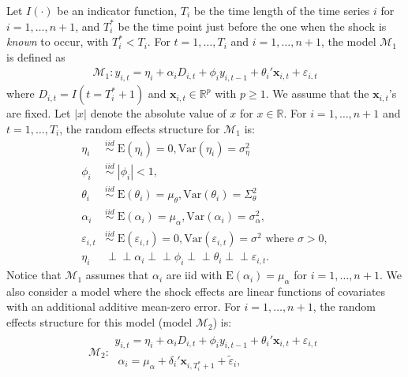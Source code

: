 \documentclass[11pt]{article}
\newcommand{\R}{\mathbb{R}}
\newcommand{\x}{\textbf{x}}
\def\mbf#1{\mathbf{#1}} %
\newcommand{\simiid}{\stackrel{iid}{\sim}} %
\def\where{\text{ where }} %
\newcommand{\indep}{\perp \!\!\! \perp } %
\newcommand{\reals}{\mathbb{R}} %
\def\t#1{\tilde{#1}} %
\def\mc#1{\mathcal{#1}} %
\def\E#1{\mathrm{E}(#1)} %
\def\var#1{\mathrm{Var}(#1)} %
\theoremstyle{definition}
\begin{document}
Let $I(\cdot)$ be an indicator function, $T_i$ be the time length of the time series $i$ for $i = 1, \ldots, n+1$, and $T_i^*$ be the time point just before the one when the shock is \emph{known} to occur, with $T_i^* < T_i$.  For $t= 1, \ldots, T_i$ and $i = 1, \ldots, n+1$, the model $\mc{M}_1$ is defined as
\begin{align}
\mc{M}_1 \colon y_{i,t} =\eta_i +\alpha_i D_{i,t} + \phi_i y_{i, t-1} + \theta_i'\mbf{x}_{i,t} + \varepsilon_{i,t}\label{equation1}
\end{align}
 where $D_{i,t} = I(t = T_i^* + 1)$ 
and $\x_{i,t} \in \R^{p}$ with $p \geq 1$.  We assume that the 
$\mbf{x}_{i,t}$'s are fixed. Let $|x|$ denote the absolute value of $x$ for $x\in \reals$. For $i = 1, \ldots, n+1$ and $t=1, \ldots, T_i$, the random effects structure for $\mc{M}_1$ is:
\begin{align*}
  \eta_i &\simiid  \; \E{\eta_i} = 0, \var{\eta_i} = \sigma^2_{\eta}\\
  \phi_i &\simiid \; |\phi_i|<1, \\
   \theta_i &\simiid  \; \E{\theta_i}=\mu_{\theta}, \var{\theta_i}=\Sigma_{\theta}^2 \\
\alpha_i &\simiid \; \E{\alpha_i}=\mu_{\alpha}, \var{\alpha_i}=\sigma_{\alpha}^2, \\
\varepsilon_{i,t} &\simiid \; \E{\varepsilon_{i,t}} =0, \var{\varepsilon_{i,t}}=\sigma^2 \where \sigma > 0 ,  \\
\eta_i &\indep  \alpha_i \indep \phi_i \indep \theta_i \indep \varepsilon_{i,t}.
\end{align*}
Notice that $\mc{M}_1$ assumes that $\alpha_i$ are iid with $\E{\alpha_i}=\mu_{\alpha}$ 
for $i = 1, \ldots, n+1$.  %
We also consider a model where the shock effects are linear functions of covariates with an additional additive mean-zero error.
For $i = 1, \ldots, n+1$, the random effects structure for this model (model $\mc{M}_2$) is:
\begin{align}
\mc{M}_2 \colon \begin{array}{l}
  y_{i,t} =\eta_i +\alpha_i D_{i,t} + \phi_i y_{i, t-1} + \theta_i'\mbf{x}_{i,t} + \varepsilon_{i,t}\\[.2cm]
  \; \alpha_i = \mu_{\alpha}+\delta_{i}'\mbf{x}_{i, T_i^*+1}+ \t{\varepsilon}_{i},
\end{array}\label{model2}
\end{align}
\end{document}
